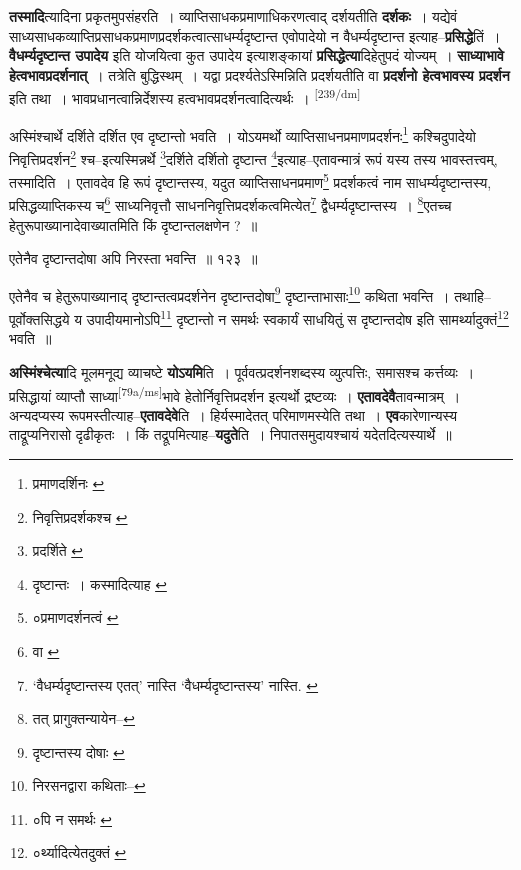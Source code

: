 \documentclass[article,12pt,a4paper]{memoir}
\begin{document}
	  \pstart \textbf{तस्मादि}त्यादिना प्रकृतमुपसंहरति । व्याप्तिसाधकप्रमाणाधिकरणत्वाद् दर्शयतीति \textbf{दर्शकः} । यद्येवं साध्यसाधकव्याप्तिप्रसाधकप्रमाणप्रदर्शकत्वात्साधर्म्यदृष्टान्त एवोपादेयो न वैधर्म्यदृष्टान्त इत्याह--\textbf{प्रसिद्धे}तिं । \textbf{वैधर्म्यदृष्टान्त उपादेय} इति योजयित्वा कुत उपादेय इत्याशङ्कायां \textbf{प्रसिद्धेत्या}दिहेतुपदं योज्यम् । \textbf{साध्याभावे हेत्वभावप्रदर्शनात्} । तत्रेति बुद्धिस्थम् । यद्वा प्रदर्श्यतेऽस्मिन्निति प्रदर्शयतीति वा \textbf{प्रदर्शनो हेत्वभावस्य प्रदर्शन} इति तथा । भावप्रधानत्वान्निर्देशस्य हत्वभावप्रदर्शनत्वादित्यर्थः ।
	\pend
      \leavevmode\textsuperscript{\rmlatinfont\tiny [239/dm]}

	  \pstart अस्मिंश्चार्थे दर्शिते दर्शित एव दृष्टान्तो भवति । योऽयमर्थो व्याप्तिसाधनप्रमाणप्रदर्शनः\footnote{प्रमाणदर्शिनः \cite{dp-msA} \cite{dp-msB} \cite{dp-edP} \cite{dp-edH} \cite{dp-edN}} कश्चिदुपादेयो निवृत्तिप्रदर्शन\footnote{निवृत्तिप्रदर्शकश्च \cite{dp-msB}} श्च--इत्यस्मिन्नर्थे \footnote{प्रदर्शिते \cite{dp-msA} \cite{dp-edP} \cite{dp-edH} \cite{dp-edE} \cite{dp-edN}}दर्शिते दर्शितो दृष्टान्त \footnote{दृष्टान्तः । कस्मादित्याह \cite{dp-edE}}इत्याह--एतावन्मात्रं रूपं यस्य तस्य भावस्तत्त्वम्, तस्मादिति । एतावदेव हि रूपं दृष्टान्तस्य, यदुत व्याप्तिसाधनप्रमाण\footnote{०प्रमाणदर्शनत्वं \cite{dp-msA} \cite{dp-msB} \cite{dp-msD} \cite{dp-edP} \cite{dp-edH} \cite{dp-edE}} प्रदर्शकत्वं नाम साधर्म्यदृष्टान्तस्य, प्रसिद्धव्याप्तिकस्य च\footnote{वा \cite{dp-msA} \cite{dp-msB} \cite{dp-msD} \cite{dp-edP} \cite{dp-edH} \cite{dp-edE} \cite{dp-edN}} साध्यनिवृत्तौ साधननिवृत्तिप्रदर्शकत्वमित्येत\footnote{‘वैधर्म्यदृष्टान्तस्य एतत्’ नास्ति \cite{dp-msB} ‘वैधर्म्यदृष्टान्तस्य’ नास्ति. \cite{dp-msD}} द्वैधर्म्यदृष्टान्तस्य । \footnote{तत् \cite{dp-msA} \cite{dp-msD} \cite{dp-edP} \cite{dp-edH} \cite{dp-edE} \cite{dp-edN} प्रागुक्तन्यायेन--\cite{dp-msD-n}}एतच्च हेतुरूपाख्यानादेवाख्यातमिति किं दृष्टान्तलक्षणेन ? ॥
	\pend
       

	  \pstart एतेनैव दृष्टान्तदोषा अपि निरस्ता भवन्ति ॥ १२३ ॥
	\pend
       

	  \pstart एतेनैव च हेतुरूपाख्यानाद् दृष्टान्तत्वप्रदर्शनेन दृष्टान्तदोषा\footnote{दृष्टान्तस्य दोषाः \cite{dp-msA} \cite{dp-edP} \cite{dp-edH} \cite{dp-edE} \cite{dp-edN}} दृष्टान्ताभासाः\footnote{निरसनद्वारा कथिताः--\cite{dp-msD-n}} कथिता भवन्ति । तथाहि--पूर्वोक्तसिद्धये य उपादीयमानोऽपि\footnote{०पि न समर्थः \cite{dp-msB}} दृष्टान्तो न समर्थः स्वकार्यं साधयितुं स दृष्टान्तदोष इति सामर्थ्यादुक्तं\footnote{०र्थ्यादित्येतदुक्तं \cite{dp-msB}} भवति ॥
	\pend
      

	  \pstart \textbf{अस्मिंश्चेत्या}दि मूलमनूद्य व्याचष्टे \textbf{योऽयमि}ति । पूर्ववत्प्रदर्शनशब्दस्य व्युत्पत्तिः, समासश्च कर्त्तव्यः । प्रसिद्धायां व्याप्तौ साध्या\leavevmode\textsuperscript{\rmlatinfont\tiny [79a/ms]}भावे हेतोर्निवृत्तिप्रदर्शन इत्यर्थो द्रष्टव्यः । \textbf{एतावदेवै}तावन्मात्रम् । अन्यदप्यस्य रूपमस्तीत्याह--\textbf{एतावदेवे}ति । हिर्यस्मादेतत् परिमाणमस्येति तथा । \textbf{एव}कारेणान्यस्य ताद्रूप्यनिरासो दृढीकृतः । किं तद्रूपमित्याह--\textbf{यदुते}ति । निपातसमुदायश्चायं यदेतदित्यस्यार्थे ॥
	\pend
      
\end{document}
